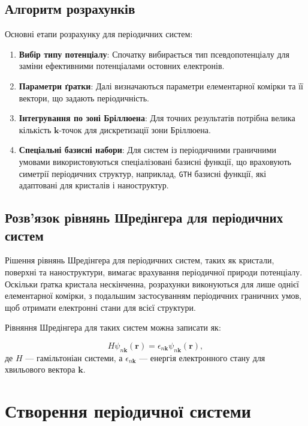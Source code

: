 \subsection{Алгоритм розрахунків}

Основні етапи розрахунку для періодичних систем:

\begin{enumerate}
    \item \textbf{Вибір типу потенціалу}: Спочатку вибирається тип псевдопотенціалу для заміни ефективними потенціалами остовних електронів.
    \item \textbf{Параметри ґратки}: Далі визначаються параметри елементарної комірки та її вектори, що задають періодичність.
    \item \textbf{Інтегрування по зоні Бріллюена}: Для точних результатів потрібна велика кількість $\mathbf{k}$-точок для дискретизації зони Бріллюена.
    \item \textbf{Спеціальні базисні набори}: Для систем із періодичними граничними умовами використовуються спеціалізовані базисні функції, що враховують симетрії періодичних структур, наприклад, \texttt{GTH} базисні функції, які адаптовані для кристалів і наноструктур.
\end{enumerate}

\subsection{Розв'язок рівнянь Шредінгера для періодичних систем}

Рішення рівнянь Шредінгера для періодичних систем, таких як кристали, поверхні та наноструктури, вимагає врахування періодичної природи потенціалу. Оскільки ґратка кристала нескінченна, розрахунки виконуються для лише однієї елементарної комірки, з подальшим застосуванням періодичних граничних умов, щоб отримати електронні стани для всієї структури.

Рівняння Шредінгера для таких систем можна записати як:

\[
H \psi_{n\mathbf{k}}(\mathbf{r}) = \epsilon_{n\mathbf{k}} \psi_{n\mathbf{k}}(\mathbf{r}),
\]
де $H$ --- гамільтоніан системи, а $\epsilon_{n\mathbf{k}}$ --- енергія електронного стану для хвильового вектора $\mathbf{k}$.


\section{Створення періодичної системи}

